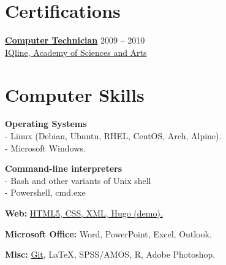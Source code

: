 \documentclass[
	12pt,a4paper %
]{article}
\newcommand{\tableentry}[3]{
	\textsc{#1} & #2\expandafter\ifstrequal\expandafter{#3}{}{\\}{\\[5pt]} %
}
\begin{document}
\begin{paracol}{2} %

\section{Certifications}

\href{https://loona-il.000webhostapp.com/resume-references/computer-technitian-certificate.jpg}{\textbf{Computer Technician}} \hfill 2009 -- 2010 \\
\href{https://loona-il.000webhostapp.com/resume-references/computer-technitian-certificate.jpg}{IQline, Academy of Sciences and Arts}

\section{Computer Skills}

\textbf{Operating Systems} \\
 - Linux (Debian, Ubuntu, RHEL, CentOS, Arch, Alpine).\\
 - Microsoft Windows.

\textbf{Command-line interpreters} \\
- Bash and other variants of Unix shell \\
- Powershell, cmd.exe

\textbf{Web:} \href{https://kirilu.netlify.app/resume/}{HTML5, CSS, XML, Hugo (demo).}

\textbf{Microsoft Office:} Word, PowerPoint, Excel, Outlook.

\textbf{Misc:} \href{https://github.com/kiril-u}{Git}, LaTeX, SPSS/AMOS, R, Adobe Photoshop.






\end{paracol}
\end{document}
